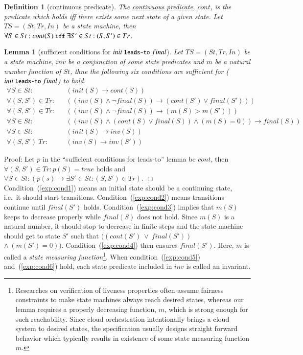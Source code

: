 \documentclass[12pt]{report}
\newtheorem{lemma}{Lemma}
\newtheorem{definition}{Definition}
\newcommand{\ra}{\rightarrow}
\newcommand{\mbstt}[1]{\mbox{\small{\tt {#1}}}}
\newcommand{\ul}{\underline}
\begin{document}
\begin{definition}[continuous predicate]
  The \ul{continuous predicate, $cont$}, is the predicate which holds
  iff there exists some next state of a given state.  Let
  $TS=(St,Tr,In)$ be a state machine, then $\forall S\in St:cont(S)
  ~\mbstt{iff}~ \exists S'\in St:(S,S')\in Tr$.
\end{definition}

\begin{lemma}[sufficient conditions for $init~\mbstt{leads-to}~final$]
  Let $TS=(St,Tr,In)$ be a state machine, $inv$ be a conjunction of
  some state predicates and $m$ be a natural number function of $St$,
  thne the following six conditions are sufficient for
  ($init~\mbstt{leads-to}~final$) to hold.
  \begin{eqnarray}
  \label{exp:cond1}
  \forall S\in St:&&(init(S)\ra cont(S))\\
  \label{exp:cond2}
  \forall (S,S')\in Tr:&&((inv(S)\land\neg final(S))
  \ra(cont(S')\lor final(S')))\\
  \label{exp:cond3}
  \forall (S,S')\in Tr:&&((inv(S)\land\neg final(S))\ra(m(S)> m(S')))\\
  \label{exp:cond4}
  \forall S\in St:&&((inv(S)\land (cont(S)\lor final(S))
  \land(m(S) = 0))\ra final(S))\\
  \label{exp:cond5}
  \forall S\in St:&&(init(S)\ra inv(S))\\
  \label{exp:cond6}
  \forall (S,S')\ Tr:&&(inv(S)\ra inv(S'))
  \end{eqnarray}
\end{lemma}
Proof: Let $p$ in the ``sufficient conditions for leads-to'' lemma
be $cont$, then $\forall (S,S')\in Tr:p(S)=true$ holds and
$\forall S\in St:(p(s)\ra\exists S'\in St:(S,S')\in Tr)$. $\Box$\\

Condition~(\ref{exp:cond1}) means an initial state should be a
continuing state, i.e.\ it should start
transitions. Condition~(\ref{exp:cond2}) means transitions continue
until $final(S')$ holds. Condition~(\ref{exp:cond3}) implies that
$m(S)$ keeps to decrease properly while $final(S)$ does not
hold. Since $m(S)$ is a natural number, it should stop to decrease in
finite steps and the state machine should get to state $S'$ such that
$((cont(S')\ \lor\ final(S'))$ $\land\ (m(S') = 0))$.
Condition~(\ref{exp:cond4}) then ensures $final(S')$. Here, $m$ is
called a {\it state measuring function}\footnote{Researches on
  verification of liveness properties often assume fairness
  constraints to make state machines always reach desired states,
  whereas our lemma requires a properly decreasing function, $m$,
  which is strong enough for such reachability.  Since cloud
  orchestration intentionally brings a cloud system to desired states,
  the specification usually designs straight forward behavior which
  typically results in existence of some state measuring function
  $m$.}.  When condition~(\ref{exp:cond5}) and~(\ref{exp:cond6}) hold,
each state predicate included in $inv$ is called an invariant. 
\end{document}
